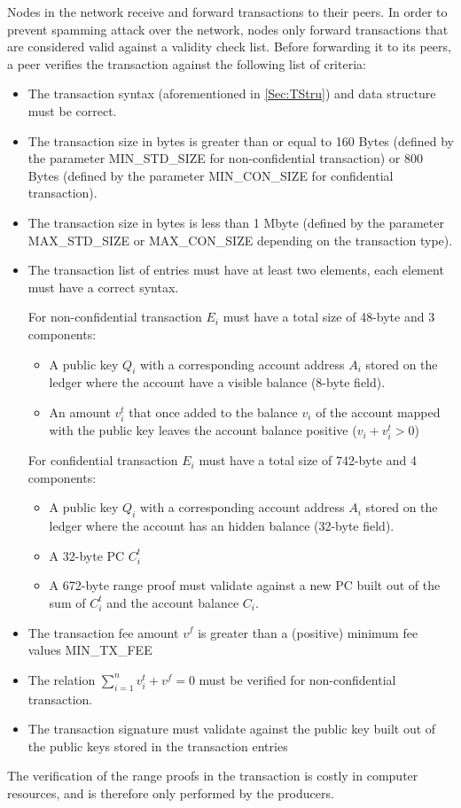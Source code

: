 Nodes in the network receive and forward transactions to their peers. In order to prevent spamming attack over the network, nodes only forward transactions that are considered valid against a validity check list. Before forwarding it to its peers, a peer verifies the transaction against the following list of criteria:
 
\begin{itemize}
\item The transaction syntax (aforementioned in \ref{Sec:TStru}) and data structure must be correct.
\item The transaction size in bytes is greater than or equal to 160 Bytes (defined by the parameter MIN\_STD\_SIZE for non-confidential transaction) or 800 Bytes (defined by the parameter MIN\_CON\_SIZE for confidential transaction).
\item The transaction size in bytes is less than 1 Mbyte (defined by the parameter MAX\_STD\_SIZE or MAX\_CON\_SIZE depending on the transaction type).
\item The transaction list of entries must have at least two elements, each element must have a correct syntax. 

For non-confidential transaction $E_i$ must have a total size of 48-byte and 3 components:
\begin{itemize}
\item A public key $Q_i$ with a corresponding account address $A_i$ stored on the ledger where the account have a visible balance (8-byte field).
\item An amount $v_i^t$ that once added to the balance $v_i$ of the account mapped with the public key leaves the account balance positive ($v_i+v_i^t > 0$)
\end{itemize}
For confidential transaction $E_i$ must have a total size of 742-byte and 4 components:

\begin{itemize}
\item A public key $Q_i$ with a corresponding account address $A_i$ stored on the ledger where the account has an hidden balance (32-byte field).
\item A 32-byte PC $C_i^t$ 
\item A 672-byte range proof must validate against a new PC built out of the sum of $C_i^t$ and the account balance $C_i$. 
\end{itemize}

\item The transaction fee amount $v^f$ is greater than a (positive) minimum fee values MIN\_TX\_FEE
\item The relation $\sum_{i=1}^{n}v^t_i + v^f = 0$ must be verified for non-confidential transaction.
\item The transaction signature must validate against the public key built out of the public keys stored in the transaction entries 
\end{itemize}

The verification of the range proofs in the transaction is costly in computer resources, and is therefore only performed by the producers. 